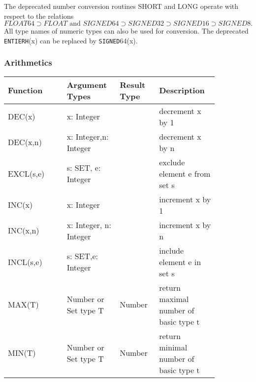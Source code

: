 \documentclass[a4wide,11pt]{article}
\newcommand{\SIGNED}{\lstinline"SIGNED"}
\newcommand{\ENTIERH}{\lstinline"ENTIERH"}
\begin{document}
The deprecated number conversion routines SHORT and LONG operate with respect to the relations
$$FLOAT64 \supset FLOAT \mbox{ and } SIGNED64 \supset SIGNED32 \supset SIGNED16 \supset SIGNED8.$$
All type names of numeric types can also be used for conversion.
The deprecated \ENTIERH(x) can be replaced by \SIGNED64(x).


\subsubsection{Arithmetics}
\begin{longtable}{|p{0.25\linewidth}|p{0.2\linewidth}|p{0.15\linewidth}|p{0.25\linewidth}|}
\hline
Function & Argument Types & Result Type & Description \\
\hline\hline
\endhead
DEC(x) & x: Integer &  & decrement x by 1 \\
DEC(x,n) & x: Integer,\newline n: Integer &  & decrement x by n \\
EXCL(s,e) & s: SET, e: Integer & & exclude element e from set s \\
INC(x) & x: Integer &  & increment x by 1 \\
INC(x,n) & x: Integer, \newline n: Integer &  & increment x by n \\
INCL(s,e) & s: SET,\newline  e: Integer & & include element e in set s \\
MAX(T) & Number or Set type T & Number & return maximal number of basic type t\\
MIN(T) & Number or Set type T & Number & return minimal number of basic type t\\
\hline
\end{longtable}
\end{document}
